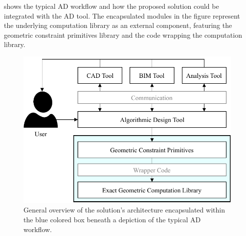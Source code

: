  shows the typical \ac{AD} workflow and how the proposed
solution could be integrated with the \ac{AD} tool.  The encapsulated modules in
the figure represent the underlying computation library as an external
component, featuring the geometric constraint primitives library and the code
wrapping the computation library.

\begin{figure}[htbp]
  \includegraphics[width=\textwidth]{fig/solution-arch}
  \caption[Solution architecture within \acs{AD} workflow]{
    General overview of the solution's architecture encapsulated within the
    blue colored box beneath a depiction of the typical \ac{AD} workflow.}%
  \label{fig:solution.arch}
\end{figure}
